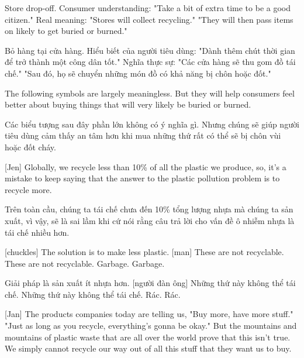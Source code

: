 \documentclass[a4paper]{article}
\begin{document}
	Store drop-off.
	Consumer understanding: "Take a bit of extra time to be a good citizen."
	Real meaning: "Stores will collect recycling."
	"They will then pass items on likely to get buried or burned."
	
	\begin{vietnamese-v2}
		Bỏ hàng tại cửa hàng.
		Hiểu biết của người tiêu dùng: "Dành thêm chút thời gian để trở thành một công dân tốt."
		Nghĩa thực sự: "Các cửa hàng sẽ thu gom đồ tái chế."
		"Sau đó, họ sẽ chuyển những món đồ có khả năng bị chôn hoặc đốt."
	\end{vietnamese-v2}
	
	The following symbols are largely meaningless.
	But they will help consumers feel better about buying things that will very likely be buried or burned.
	
	\begin{vietnamese-v2}
		Các biểu tượng sau đây phần lớn không có ý nghĩa gì.
		Nhưng chúng sẽ giúp người tiêu dùng cảm thấy an tâm hơn khi mua những thứ rất có thể sẽ bị chôn vùi hoặc đốt cháy.
	\end{vietnamese-v2}
	
	[Jen] Globally, we recycle less than 10\% of all the plastic we produce, so, it's a mistake to keep saying that the answer to the plastic pollution problem is to recycle more.
	
	\begin{vietnamese-v2}
		[Jen] Trên toàn cầu, chúng ta tái chế chưa đến 10\% tổng lượng nhựa mà chúng ta sản xuất, vì vậy, sẽ là sai lầm khi cứ nói rằng câu trả lời cho vấn đề ô nhiễm nhựa là tái chế nhiều hơn.
	\end{vietnamese-v2}
	
	[chuckles] The solution is to make less plastic.
	[man] These are not recyclable.
	These are not recyclable. Garbage. Garbage.
	
	\begin{vietnamese-v2}
		 Giải pháp là sản xuất ít nhựa hơn.
		[người đàn ông] Những thứ này không thể tái chế.
		Những thứ này không thể tái chế. Rác. Rác.
	\end{vietnamese-v2}
	
	[Jan] The products companies today are telling us,
	"Buy more, have more stuff."
	"Just as long as you recycle, everything's gonna be okay."
	But the mountains and mountains of plastic waste that are all over the world prove that this isn't true.
	We simply cannot recycle our way out of all this stuff that they want us to buy.
	
\end{document}
